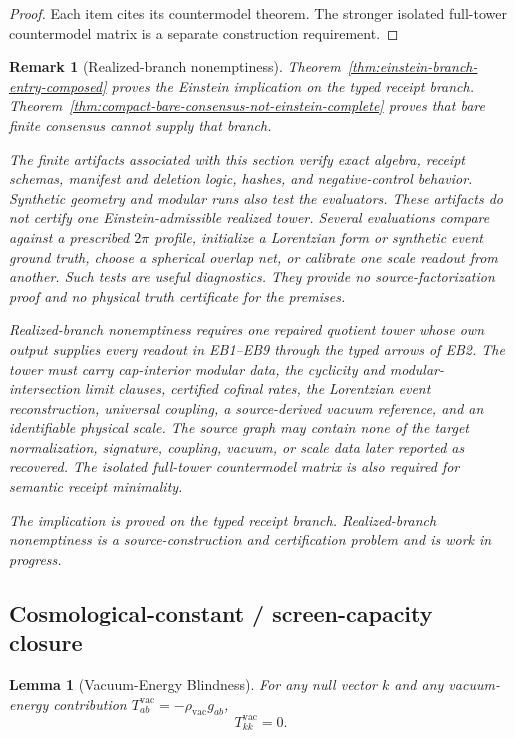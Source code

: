 \documentclass[11pt]{article}
\newtheorem{lemma}[theorem]{Lemma}
\newtheorem{remark}[theorem]{Remark}
\begin{document}
\begin{proof}
Each item cites its countermodel theorem. The stronger isolated full-tower
countermodel matrix is a separate construction requirement.
\end{proof}

\begin{remark}[Realized-branch nonemptiness]
\label{rem:realized-branch-status}
Theorem~\ref{thm:einstein-branch-entry-composed} proves the Einstein
implication on the typed receipt branch.
Theorem~\ref{thm:compact-bare-consensus-not-einstein-complete} proves that
bare finite consensus cannot supply that branch.

The finite artifacts associated with this section verify exact algebra,
receipt schemas, manifest and deletion logic, hashes, and negative-control
behavior. Synthetic geometry and modular runs also test the evaluators. These
artifacts do not certify one Einstein-admissible realized tower. Several
evaluations compare against a prescribed \(2\pi\) profile, initialize a
Lorentzian form or synthetic event ground truth, choose a spherical overlap
net, or calibrate one scale readout from another. Such tests are useful
diagnostics. They provide no source-factorization proof and no physical truth
certificate for the premises.

Realized-branch nonemptiness requires one repaired quotient tower whose own
output supplies every readout in EB1--EB9 through the typed arrows of EB2.
The tower must carry cap-interior modular data, the cyclicity and
modular-intersection limit clauses, certified cofinal rates, the Lorentzian
event reconstruction, universal coupling, a source-derived vacuum reference,
and an identifiable physical scale. The source graph may contain none of the
target normalization, signature, coupling, vacuum, or scale data later
reported as recovered. The isolated full-tower countermodel matrix is also
required for semantic receipt minimality.

The implication is proved on the typed receipt branch. Realized-branch
nonemptiness is a source-construction and certification problem and is work in
progress.
\end{remark}

\subsection{Cosmological-constant / screen-capacity closure}

\begin{lemma}[Vacuum-Energy Blindness]\label{lem:vac}
For any null vector $k$ and any vacuum-energy contribution $T^{\mathrm{vac}}_{ab}=-\rho_{\mathrm{vac}}g_{ab}$,
\[
T^{\mathrm{vac}}_{kk}=0.
\]
\end{lemma}
\end{document}
